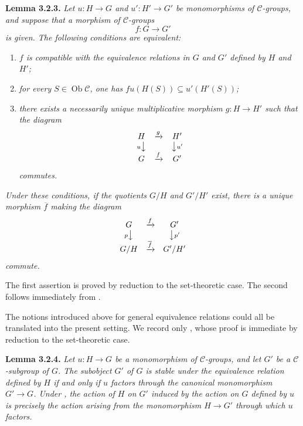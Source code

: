 \medskip
\noindent{}\textbf{Lemma 3.2.3.}
\textit{Let \(u:H\to G\) and \(u':H'\to G'\) be monomorphisms of
\(\mathscr C\)-groups, and suppose that a morphism of \(\mathscr C\)-groups
\[
  f:G\longrightarrow G'
\]
is given. The following conditions are equivalent:}
\begin{enumerate}
  \item[(i)] \textit{\(f\) is compatible with the equivalence relations in
  \(G\) and \(G'\) defined by \(H\) and \(H'\);}
  \item[(ii)] \textit{for every \(S\in\operatorname{Ob}\mathscr C\), one
  has \(fu(H(S))\subseteq u'(H'(S))\);}
  \item[(iii)] \textit{there exists a necessarily unique multiplicative
  morphism \(g:H\to H'\) such that the diagram}
  \[
    \begin{array}{ccc}
      H & \xrightarrow{g} & H'\\
      {\scriptstyle u}\big\downarrow && \big\downarrow{\scriptstyle u'}\\
      G & \xrightarrow{f} & G'
    \end{array}
  \]
  \textit{commutes.}
\end{enumerate}
\textit{Under these conditions, if the quotients \(G/H\) and \(G'/H'\)
exist, there is a unique morphism \(\overline f\) making the diagram}
\[
  \begin{array}{ccc}
    G & \xrightarrow{f} & G'\\
    {\scriptstyle p}\big\downarrow && \big\downarrow{\scriptstyle p'}\\
    G/H & \xrightarrow{\overline f} & G'/H'
  \end{array}
\]
\textit{commute.}

The first assertion is proved by reduction to the set-theoretic case. The
second follows immediately from .

The notions introduced above for general equivalence relations could all be
translated into the present setting. We record only ,
whose proof is immediate by reduction to the set-theoretic case.

\medskip
\noindent{}\textbf{Lemma 3.2.4.}
\textit{Let \(u:H\to G\) be a monomorphism of \(\mathscr C\)-groups, and
let \(G'\) be a \(\mathscr C\)-subgroup of \(G\). The subobject \(G'\) of
\(G\) is stable under the equivalence relation defined by \(H\) if and only
if \(u\) factors through the canonical monomorphism \(G'\to G\). Under , the action of \(H\) on \(G'\) induced by the action on \(G\)
defined by \(u\) is precisely the action arising from the monomorphism
\(H\to G'\) through which \(u\) factors.}

